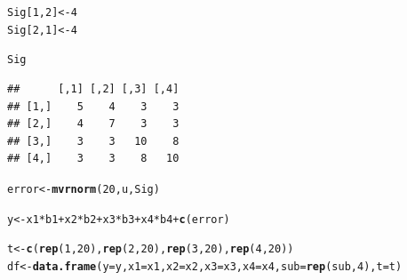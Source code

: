 \documentclass[11pt,a4paper,twoside]{book}
\makeatletter
\newcommand{\hlnum}[1]{\textcolor[rgb]{0.686,0.059,0.569}{#1}}%
\newcommand{\hlopt}[1]{\textcolor[rgb]{0,0,0}{#1}}%
\newcommand{\hlstd}[1]{\textcolor[rgb]{0.345,0.345,0.345}{#1}}%
\newcommand{\hlkwb}[1]{\textcolor[rgb]{0.69,0.353,0.396}{#1}}%
\newcommand{\hlkwc}[1]{\textcolor[rgb]{0.333,0.667,0.333}{#1}}%
\newcommand{\hlkwd}[1]{\textcolor[rgb]{0.737,0.353,0.396}{\textbf{#1}}}%
\newenvironment{kframe}{%
 \def\at@end@of@kframe{}%
 \ifinner\ifhmode%
  \def\at@end@of@kframe{\end{minipage}}%
  \begin{minipage}{\columnwidth}%
 \fi\fi%
 \def\FrameCommand##1{\hskip\@totalleftmargin \hskip-\fboxsep
 \colorbox{shadecolor}{##1}\hskip-\fboxsep
     \hskip-\linewidth \hskip-\@totalleftmargin \hskip\columnwidth}%
 \MakeFramed {\advance\hsize-\width
   \@totalleftmargin\z@ \linewidth\hsize
   \@setminipage}}%
 {\par\unskip\endMakeFramed%
 \at@end@of@kframe}
\newenvironment{knitrout}{}{} %
\makeatother
\begin{document}
\begin{knitrout}
\begin{kframe}
\begin{alltt}
\hlstd{Sig[}\hlnum{1}\hlstd{,}\hlnum{2}\hlstd{]} \hlkwb{<-} \hlnum{4}
\hlstd{Sig[}\hlnum{2}\hlstd{,}\hlnum{1}\hlstd{]} \hlkwb{<-}\hlnum{4}

\hlstd{Sig}
\end{alltt}
\begin{verbatim}
##      [,1] [,2] [,3] [,4]
## [1,]    5    4    3    3
## [2,]    4    7    3    3
## [3,]    3    3   10    8
## [4,]    3    3    8   10
\end{verbatim}
\begin{alltt}
\hlstd{error} \hlkwb{<-} \hlkwd{mvrnorm}\hlstd{(}\hlnum{20}\hlstd{, u, Sig)}

\hlstd{y}\hlkwb{<-} \hlstd{x1}\hlopt{*}\hlstd{b1} \hlopt{+}\hlstd{x2}\hlopt{*}\hlstd{b2} \hlopt{+} \hlstd{x3}\hlopt{*}\hlstd{b3} \hlopt{+}\hlstd{x4}\hlopt{*}\hlstd{b4} \hlopt{+}\hlkwd{c}\hlstd{(error)}


\hlstd{t} \hlkwb{<-} \hlkwd{c}\hlstd{(}\hlkwd{rep}\hlstd{(}\hlnum{1}\hlstd{,} \hlnum{20}\hlstd{),} \hlkwd{rep}\hlstd{(}\hlnum{2}\hlstd{,} \hlnum{20}\hlstd{),} \hlkwd{rep}\hlstd{(}\hlnum{3}\hlstd{,} \hlnum{20}\hlstd{),} \hlkwd{rep}\hlstd{(}\hlnum{4}\hlstd{,} \hlnum{20}\hlstd{))}
\hlstd{df} \hlkwb{<-} \hlkwd{data.frame}\hlstd{(}\hlkwc{y}\hlstd{=y,} \hlkwc{x1} \hlstd{= x1,} \hlkwc{x2}\hlstd{=x2 ,} \hlkwc{x3} \hlstd{= x3,} \hlkwc{x4} \hlstd{= x4,} \hlkwc{sub} \hlstd{=} \hlkwd{rep}\hlstd{(sub,}\hlnum{4}\hlstd{),} \hlkwc{t} \hlstd{=t)}




\end{alltt}
\end{kframe}
\end{knitrout}
\end{document}
